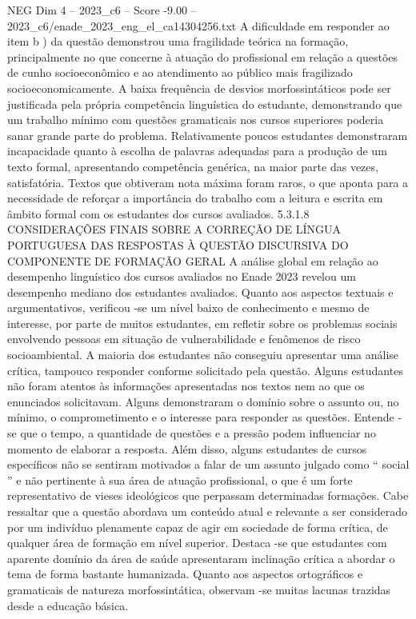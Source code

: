 \begin{textsample}{NEG Dim 4 – 2023\_c6 – Score -9.00 – 2023\_c6/enade\_2023\_eng\_el\_ca14304256.txt}
A dificuldade em responder ao item b ) da questão demonstrou uma fragilidade teórica na formação, principalmente no que concerne à atuação do profissional em relação a questões de cunho socioeconômico e ao atendimento ao público mais fragilizado socioeconomicamente.
A baixa frequência de desvios morfossintáticos pode ser justificada pela própria competência linguística do estudante, demonstrando que um trabalho mínimo com questões gramaticais nos cursos superiores poderia sanar grande parte do problema.
Relativamente poucos estudantes demonstraram incapacidade quanto à escolha de palavras adequadas para a produção de um texto formal, apresentando competência genérica, na maior parte das vezes, satisfatória.
Textos que obtiveram nota máxima foram raros, o que aponta para a necessidade de reforçar a importância do trabalho com a leitura e escrita em âmbito formal com os estudantes dos cursos avaliados. 5.3.1.8 CONSIDERAÇÕES FINAIS SOBRE A CORREÇÃO DE LÍNGUA PORTUGUESA DAS RESPOSTAS À QUESTÃO DISCURSIVA DO COMPONENTE DE FORMAÇÃO GERAL A análise global em relação ao desempenho linguístico dos cursos avaliados no Enade 2023 revelou um desempenho mediano dos estudantes avaliados.
Quanto aos aspectos textuais e argumentativos, verificou -se um nível baixo de conhecimento e mesmo de interesse, por parte de muitos estudantes, em refletir sobre os problemas sociais envolvendo pessoas em situação de vulnerabilidade e fenômenos de risco socioambiental.
A maioria dos estudantes não conseguiu apresentar uma análise crítica, tampouco responder conforme solicitado pela questão.
Alguns estudantes não foram atentos às informações apresentadas nos textos nem ao que os enunciados solicitavam.
Alguns demonstraram o domínio sobre o assunto ou, no mínimo, o comprometimento e o interesse para responder as questões.
Entende -se que o tempo, a quantidade de questões e a pressão podem influenciar no momento de elaborar a resposta.
Além disso, alguns estudantes de cursos específicos não se sentiram motivados a falar de um assunto julgado como “ social ” e não pertinente à sua área de atuação profissional, o que é um forte representativo de vieses ideológicos que perpassam determinadas formações.
Cabe ressaltar que a questão abordava um conteúdo atual e relevante a ser considerado por um indivíduo plenamente capaz de agir em sociedade de forma crítica, de qualquer área de formação em nível superior.
Destaca -se que estudantes com aparente domínio da área de saúde apresentaram inclinação crítica a abordar o tema de forma bastante humanizada.
Quanto aos aspectos ortográficos e gramaticais de natureza morfossintática, observam -se muitas lacunas trazidas desde a educação básica.

\end{textsample}
